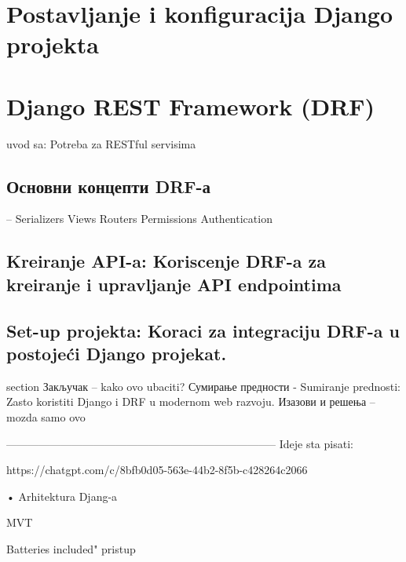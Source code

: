 \documentclass[12pt,oneside]{memoir}
\begin{document}
\section{Postavljanje i konfiguracija Django projekta}

\section{Django REST Framework (DRF)}

uvod sa: Potreba za RESTful servisima

\subsection{ Основни концепти DRF-а}
-- Serializers
Views
Routers
Permissions
Authentication

\subsection{Kreiranje API-a: Koriscenje DRF-a za kreiranje i upravljanje API endpointima}

\subsection{Set-up projekta: Koraci za integraciju DRF-a u postojeći Django projekat.}

section Закључак
-- kako ovo ubaciti?
Сумирање предности - Sumiranje prednosti: Zasto koristiti Django i DRF u modernom web razvoju.
Изазови и решења -- mozda samo ovo


--------------------------------------------------------------------------
Ideje sta pisati:


https://chatgpt.com/c/8bfb0d05-563e-44b2-8f5b-c428264c2066

• Arhitektura Djang-a

MVT

Batteries included" pristup
\end{document}
